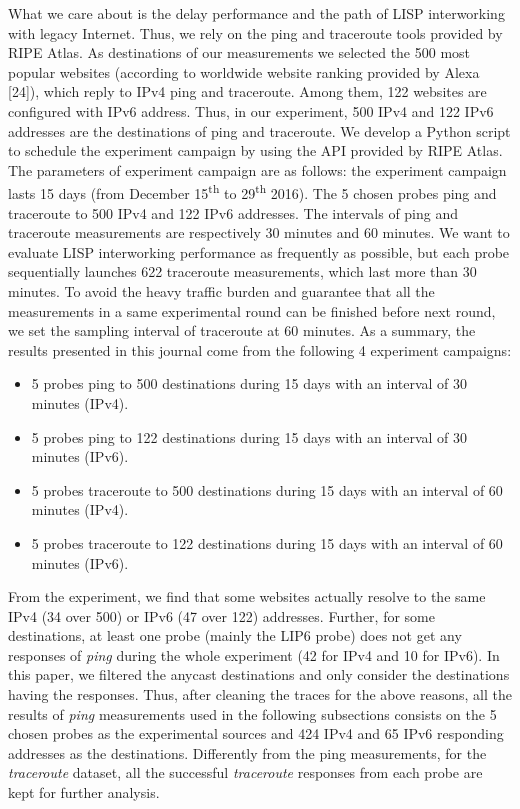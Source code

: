 What we care about is the delay performance and the path of LISP interworking with legacy Internet. Thus, we rely on the ping and traceroute tools provided by RIPE Atlas. As destinations of our measurements we selected the 500 most popular websites (according to worldwide website ranking provided by Alexa [24]), which reply to IPv4 ping and traceroute. Among them, 122 websites are configured with IPv6 address. Thus, in our experiment, 500 IPv4 and 122 IPv6 addresses are the destinations of ping and traceroute. We develop a Python script to schedule the experiment campaign by using the API provided by RIPE Atlas. The parameters of experiment campaign are as follows: the experiment campaign lasts 15 days (from December 15\textsuperscript{th} to 29\textsuperscript{th} 2016). The 5 chosen probes ping and traceroute to 500 IPv4 and 122 IPv6 addresses. The intervals of ping and traceroute measurements are respectively 30 minutes and 60 minutes. We want to evaluate LISP interworking performance as frequently as possible, but each probe sequentially launches 622 traceroute measurements, which last more than 30 minutes. To avoid the heavy traffic burden and guarantee that all the measurements in a same experimental round can be finished before next round, we set the sampling interval of traceroute at 60 minutes. As a summary, the results presented in this journal come from the following 4 experiment campaigns:
\begin{itemize}[noitemsep,topsep=0pt]
	\item 5 probes ping to 500 destinations during 15 days with an interval of 30 minutes (IPv4).
	\item 5 probes ping to 122 destinations during 15 days with an interval of 30 minutes (IPv6).
	\item 5 probes traceroute to 500 destinations during 15 days with an interval of 60 minutes (IPv4).
	\item 5 probes traceroute to 122 destinations during 15 days with an interval of 60 minutes (IPv6).
\end{itemize}

From the experiment, we find that some websites actually resolve to the same IPv4 (34 over 500) or IPv6 (47 over 122) addresses. Further, for some destinations, at least one probe (mainly the LIP6 probe) does not get any responses of \emph{ping} during the whole experiment (42 for IPv4 and 10 for IPv6). In this paper, we filtered the anycast destinations and only consider the destinations having the responses. Thus, after cleaning the traces for the above reasons, all the results of \emph{ping} measurements used in the following subsections consists on the 5 chosen probes as the experimental sources and 424 IPv4 and 65 IPv6 responding addresses as the destinations. Differently from the ping measurements, for the \emph{traceroute} dataset, all the successful \emph{traceroute} responses from each probe are kept for further analysis.


